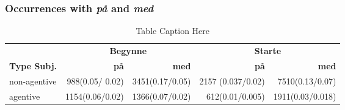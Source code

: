 \documentclass{article}
\begin{document}


\subsubsection{Occurrences with \emph{på} and \emph{med}}
\begin{table}[h!]
    \centering
    \begin{tabular}{lrrrr}
        \toprule
        & \multicolumn{2}{c}{\textbf{Begynne}} & \multicolumn{2}{c}{\textbf{Starte}} \\
        \cmidrule(lr){2-3} \cmidrule(lr){4-5}
        \textbf{Type Subj.} & \textbf{på} & \textbf{med} & \textbf{på} & \textbf{med} \\
        \midrule
        non-agentive &   988(0.05/ 0.02) & 3451(0.17/0.05) & 2157	(0.037/0.02) & 7510(0.13/0.07)\\
        agentive      &  1154(0.06/0.02) & 1366(0.07/0.02)  & 612(0.01/0.005) &  1911(0.03/0.018) \\
        \bottomrule
    \end{tabular}
    \caption{Table Caption Here}
    \label{tab:initiation_verbs_agentive_no_agentive}
\end{table}
\end{document}
